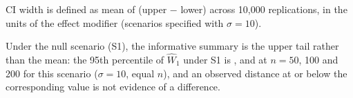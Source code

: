 \documentclass[AMA,Times1COL]{WileyNJDv5}
\begin{document}
\begin{table}[ht]
\centering
\caption{RMSE and mean CI width of $\widehat{W}_1$ by scenario and sample size, in the original units of the effect modifier.\label{tab:precision}}
\begin{tablenotes}
\item CI width is defined as mean of (upper $-$ lower) across 10{,}000 replications, in the units of the effect modifier (scenarios specified with $\sigma = 10$).
\end{tablenotes}
\end{table}

Under the null scenario (S1), the informative summary is the upper tail rather than the mean: the 95th percentile of $\widehat{W}_1$ under S1 is ,  and  at $n = 50$, 100 and 200 for this scenario ($\sigma = 10$, equal $n$), and an observed distance at or below the corresponding value is not evidence of a difference.


\end{document}
